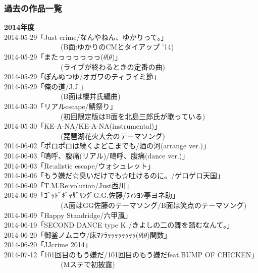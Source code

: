 \subsubsection{過去の作品一覧}
{\large{\bf 2014年度}}\\
2014-05-29「Just crime/なんやねん、ゆかりって。」\\
 \ \ \ \ \ \ \ \ \ \ \ \ \ \ \ \ (B面:ゆかりのCMとタイアップ '14) \\
2014-05-29「またっっっっっっ($\theta$l$\theta$)」\\
 \ \ \ \ \ \ \ \ \ \ \ \ \ \ \ \ (ライブが終わるときの定番の曲) \\
2014-05-29「ぽんぬつゆ/オガワのティライミ節」 \\
2014-05-29「俺の道/J.J.」\\
 \ \ \ \ \ \ \ \ \ \ \ \ \ \ \ \ (B面は櫻井氏編曲) \\
2014-05-30「リアルescape/鯖祭り」\\
 \ \ \ \ \ \ \ \ \ \ \ \ \ \ \ \ (初回限定版はB面を北島三郎氏が歌っている) \\
2014-05-30「KE-A-NA/KE-A-NA(instrumental)」\\
 \ \ \ \ \ \ \ \ \ \ \ \ \ \ \ \ (琵琶湖花火大会のテーマソング) \\
2014-06-02「ポロポロは続くよどこまでも/酒の河(arrange ver.)」 \\
2014-06-03「嗚呼、腹痛(リアル)/嗚呼、腹痛(dance ver.)」 \\
2014-06-03「Re:alistic escape/ウォシュレット」 \\
2014-06-06「もう嫌だ☆臭いだけでも☆吐けるのに。/ゲロゲロ天国」\\ 
2014-06-09「T.M.Re:volution/Just西川」 \\
2014-06-09「ｺﾞｯﾄﾞｷﾞｬｻﾞﾘﾝｸﾞG.G.佐藤/ﾌｧﾝﾖﾝ亭ヨネ助」\\
 \ \ \ \ \ \ \ \ \ \ \ \ \ \ \ \ (A面はGG佐藤のテーマソング/B面は笑点のテーマソング) \\
2014-06-09「Happy Standridge/六甲颪」 \\
2014-06-19「SECOND DANCE type K /きよしの二の舞を踏むなんて。」\\ 
2014-06-20「御釜ノムコウ/床ﾏｧﾗｯｯｯｯｯｯｯｯ($\theta$l$\theta$)関数」 \\
2014-06-20「JJcrime 2014」 \\
2014-07-12「101回目のもう嫌だ/101回目のもう嫌だfeat.BUMP OF CHICKEN」\\
 \ \ \ \ \ \ \ \ \ \ \ \ \ \ \ \ (Mステで初披露) \\
